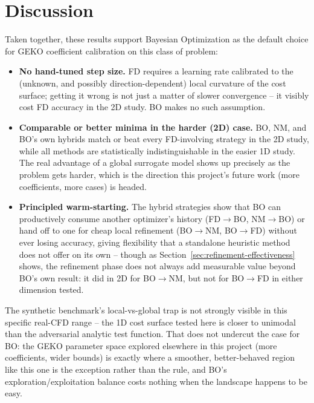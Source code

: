 \section{Discussion}

Taken together, these results support Bayesian Optimization as the default
choice for GEKO coefficient calibration on this class of problem:

\begin{itemize}
  \item \textbf{No hand-tuned step size.} FD requires a learning rate calibrated
        to the (unknown, and possibly direction-dependent) local curvature of
        the cost surface; getting it wrong is not just a matter of slower
        convergence -- it visibly cost FD accuracy in the 2D study. BO makes no
        such assumption.
  \item \textbf{Comparable or better minima in the harder (2D) case.} BO, NM,
        and BO's own hybrids match or beat every FD-involving strategy in the
        2D study, while all methods are statistically indistinguishable in the
        easier 1D study. The real advantage of a global surrogate model shows
        up precisely as the problem gets harder, which is the direction this
        project's future work (more coefficients, more cases) is headed.
  \item \textbf{Principled warm-starting.} The hybrid strategies show that BO
        can productively consume another optimizer's history (FD$\to$BO,
        NM$\to$BO) or hand off to one for cheap local refinement (BO$\to$NM,
        BO$\to$FD) without ever losing accuracy, giving flexibility that a
        standalone heuristic method does not offer on its own -- though as
        Section~\ref{sec:refinement-effectiveness} shows, the refinement phase
        does not always add measurable value beyond BO's own result: it did in
        2D for BO$\to$NM, but not for BO$\to$FD in either dimension tested.
\end{itemize}

The synthetic benchmark's local-vs-global trap is not strongly visible in this
specific real-CFD range -- the 1D cost surface tested here is closer to unimodal
than the adversarial analytic test function. That does not undercut the case for
BO: the GEKO parameter space explored elsewhere in this project (more
coefficients, wider bounds) is exactly where a smoother, better-behaved region
like this one is the exception rather than the rule, and BO's
exploration/exploitation balance costs nothing when the landscape happens to be
easy.

